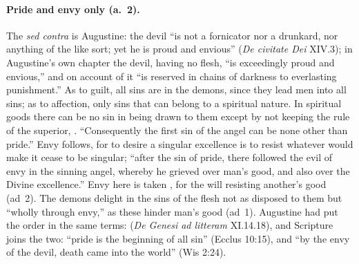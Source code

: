 \paragraph{Pride and envy only (a.~2).} The \emph{sed contra} is
Augustine: the devil ``is not a fornicator nor a drunkard, nor anything
of the like sort; yet he is proud and envious'' (\emph{De civitate Dei}
XIV.3); in Augustine's own chapter the devil, having no flesh, ``is
exceedingly proud and envious,'' and on account of it ``is reserved in
chains of darkness to everlasting punishment.'' As to guilt, all sins are in the demons,
since they lead men into all sins; as to affection, only sins that can
belong to a spiritual nature. In spiritual goods there can be no sin in
being drawn to them except by not keeping the rule of the superior,
. ``Consequently the first sin of the angel can be none other than
pride.'' Envy follows, for to desire a singular excellence is to resist
whatever would make it cease to be singular; ``after the sin of pride,
there followed the evil of envy in the sinning angel, whereby he grieved
over man's good, and also over the Divine excellence.'' Envy here is
taken , for the will resisting another's good (ad~2). The demons delight in the sins of the
flesh not as disposed to them but ``wholly through envy,'' as these
hinder man's good (ad~1). Augustine had put the order in the same terms:
 (\emph{De Genesi ad
litteram} XI.14.18), and Scripture joins the two:
``pride is the beginning of all sin'' (Ecclus 10:15), and ``by the envy
of the devil, death came into the world'' (Wis 2:24).

